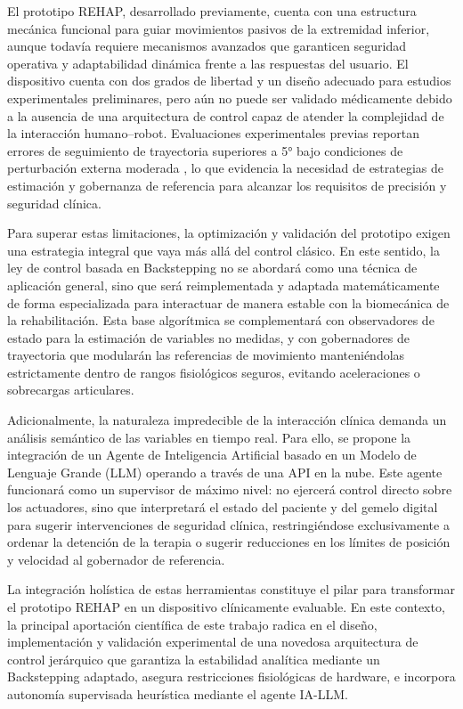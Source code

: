 \documentclass[a4paper,12pt]{article}
\begin{document}
El prototipo REHAP, desarrollado previamente, cuenta con una estructura mecánica funcional para guiar movimientos pasivos de la extremidad inferior, aunque todavía requiere mecanismos avanzados que garanticen seguridad operativa y adaptabilidad dinámica frente a las respuestas del usuario. El dispositivo cuenta con dos grados de libertad y un diseño adecuado para estudios experimentales preliminares, pero aún no puede ser validado médicamente debido a la ausencia de una arquitectura de control capaz de atender la complejidad de la interacción humano–robot. Evaluaciones experimentales previas reportan errores de seguimiento de trayectoria superiores a 5° bajo condiciones de perturbación externa moderada \citep{reyes2025comparative}, lo que evidencia la necesidad de estrategias de estimación y gobernanza de referencia para alcanzar los requisitos de precisión y seguridad clínica.

Para superar estas limitaciones, la optimización y validación del prototipo exigen una estrategia integral que vaya más allá del control clásico. En este sentido, la ley de control basada en Backstepping no se abordará como una técnica de aplicación general, sino que será reimplementada y adaptada matemáticamente de forma especializada para interactuar de manera estable con la biomecánica de la rehabilitación. Esta base algorítmica se complementará con observadores de estado para la estimación de variables no medidas, y con gobernadores de trayectoria que modularán las referencias de movimiento manteniéndolas estrictamente dentro de rangos fisiológicos seguros, evitando aceleraciones o sobrecargas articulares.

Adicionalmente, la naturaleza impredecible de la interacción clínica demanda un análisis semántico de las variables en tiempo real. Para ello, se propone la integración de un Agente de Inteligencia Artificial basado en un Modelo de Lenguaje Grande (LLM) operando a través de una API en la nube. Este agente funcionará como un supervisor de máximo nivel: no ejercerá control directo sobre los actuadores, sino que interpretará el estado del paciente y del gemelo digital para sugerir intervenciones de seguridad clínica, restringiéndose exclusivamente a ordenar la detención de la terapia o sugerir reducciones en los límites de posición y velocidad al gobernador de referencia.

La integración holística de estas herramientas constituye el pilar para transformar el prototipo REHAP en un dispositivo clínicamente evaluable. En este contexto, la principal aportación científica de este trabajo radica en el diseño, implementación y validación experimental de una novedosa arquitectura de control jerárquico que garantiza la estabilidad analítica mediante un Backstepping adaptado, asegura restricciones fisiológicas de hardware, e incorpora autonomía supervisada heurística mediante el agente IA-LLM.
\end{document}

